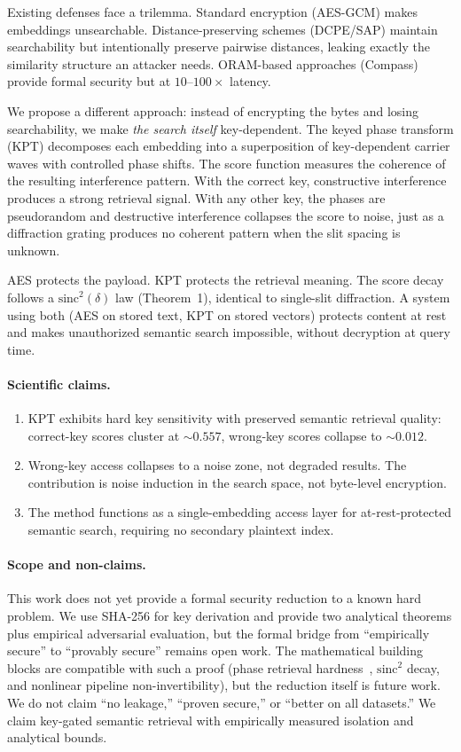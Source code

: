 \documentclass{article}
\begin{document}
Existing defenses face a trilemma.
Standard encryption (AES-GCM) makes embeddings unsearchable.
Distance-preserving schemes (DCPE/SAP) maintain searchability but intentionally preserve pairwise distances, leaking exactly the similarity structure an attacker needs.
ORAM-based approaches (Compass) provide formal security but at $10$--$100\times$ latency.

We propose a different approach: instead of encrypting the bytes and losing searchability, we make \emph{the search itself} key-dependent.
The keyed phase transform (KPT) decomposes each embedding into a superposition of key-dependent carrier waves with controlled phase shifts.
The score function measures the coherence of the resulting interference pattern.
With the correct key, constructive interference produces a strong retrieval signal.
With any other key, the phases are pseudorandom and destructive interference collapses the score to noise, just as a diffraction grating produces no coherent pattern when the slit spacing is unknown.

AES protects the payload. KPT protects the retrieval meaning.
The score decay follows a $\mathrm{sinc}^2(\delta)$ law (Theorem~1), identical to single-slit diffraction.
A system using both (AES on stored text, KPT on stored vectors) protects content at rest and makes unauthorized semantic search impossible, without decryption at query time.

\paragraph{Scientific claims.}
\begin{enumerate}[nosep]
  \item KPT exhibits hard key sensitivity with preserved semantic retrieval quality: correct-key scores cluster at ${\sim}0.557$, wrong-key scores collapse to ${\sim}0.012$.
  \item Wrong-key access collapses to a noise zone, not degraded results. The contribution is noise induction in the search space, not byte-level encryption.
  \item The method functions as a single-embedding access layer for at-rest-protected semantic search, requiring no secondary plaintext index.
\end{enumerate}

\paragraph{Scope and non-claims.}
This work does not yet provide a formal security reduction to a known hard problem.
We use SHA-256 for key derivation and provide two analytical theorems plus empirical adversarial evaluation, but the formal bridge from ``empirically secure'' to ``provably secure'' remains open work.
The mathematical building blocks are compatible with such a proof (phase retrieval hardness~\citep{maillard2020}, $\mathrm{sinc}^2$ decay, and nonlinear pipeline non-invertibility), but the reduction itself is future work.
We do not claim ``no leakage,'' ``proven secure,'' or ``better on all datasets.''
We claim key-gated semantic retrieval with empirically measured isolation and analytical bounds.
\end{document}
